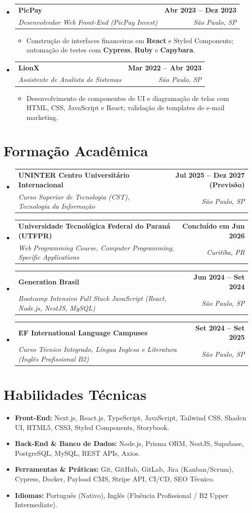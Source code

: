 \documentclass[a4paper,10pt]{article}
\makeatletter
\newcommand{\resumeItem}[1]{
  \item\small{#1}
}
\newcommand{\resumeSubheading}[4]{
  \vspace{1pt}\item[]
    \begin{tabular*}{1.0\textwidth}[t]{l@{\extracolsep{\fill}}r}
      \textbf{#1} & \textbf{\small #2} \\
      \textit{\small#3} & \textit{\small #4} \\
    \end{tabular*}\vspace{-4pt}
}
\makeatother
\begin{document}
\begin{itemize}[leftmargin=0pt, label={}]
  \resumeSubheading
    {PicPay}{Abr 2023 -- Dez 2023}
    {Desenvolvedor Web Front-End (PicPay Invest)}{São Paulo, SP}
    \begin{itemize}[leftmargin=12pt]
      \resumeItem{Construção de interfaces financeiras em \textbf{React} e Styled Components; automação de testes com \textbf{Cypress}, \textbf{Ruby} e \textbf{Capybara}.}
    \end{itemize}

  \resumeSubheading
    {LionX}{Mar 2022 -- Abr 2023}
    {Assistente de Analista de Sistemas}{São Paulo, SP}
    \begin{itemize}[leftmargin=12pt]
      \resumeItem{Desenvolvimento de componentes de UI e diagramação de telas com HTML, CSS, JavaScript e React; validação de templates de e-mail marketing.}
    \end{itemize}

\end{itemize}

\section{Formação Acadêmica}
\begin{itemize}[leftmargin=0pt, label={}]
  \resumeSubheading
    {UNINTER Centro Universitário Internacional}{Jul 2025 -- Dez 2027 (Previsão)}
    {Curso Superior de Tecnologia (CST), Tecnologia da Informação}{São Paulo, SP}

  \resumeSubheading
    {Universidade Tecnológica Federal do Paraná (UTFPR)}{Concluído em Jun 2026}
    {Web Programming Course, Computer Programming, Specific Applications}{Curitiba, PR}

  \resumeSubheading
    {Generation Brasil}{Jun 2024 -- Set 2024}
    {Bootcamp Intensivo Full Stack JavaScript (React, Node.js, NestJS, MySQL)}{São Paulo, SP}

  \resumeSubheading
    {EF International Language Campuses}{Set 2024 -- Set 2025}
    {Curso Técnico Integrado, Língua Inglesa e Literatura (Inglês Profissional B2)}{São Paulo, SP}
\end{itemize}

\section{Habilidades Técnicas}
\begin{itemize}[leftmargin=12pt]
  \item \textbf{Front-End:} Next.js, React.js, TypeScript, JavaScript, Tailwind CSS, Shadcn UI, HTML5, CSS3, Styled Components, Storybook.
  \item \textbf{Back-End \& Banco de Dados:} Node.js, Prisma ORM, NestJS, Supabase, PostgreSQL, MySQL, REST APIs, Axios.
  \item \textbf{Ferramentas \& Práticas:} Git, GitHub, GitLab, Jira (Kanban/Scrum), Cypress, Docker, Payload CMS, Stripe API, CI/CD, SEO Técnico.
  \item \textbf{Idiomas:} Português (Nativo), Inglês (Fluência Profissional / B2 Upper Intermediate).
\end{itemize}
\end{document}
